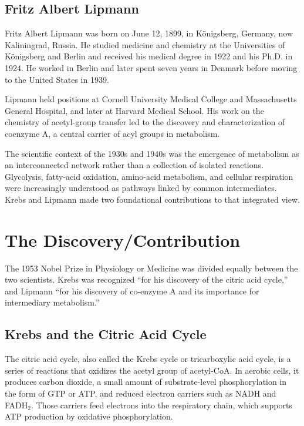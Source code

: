 \subsection{Fritz Albert Lipmann}

Fritz Albert Lipmann was born on June 12, 1899, in K\"onigsberg, Germany, now Kaliningrad, Russia. He studied medicine and chemistry at the Universities of K\"onigsberg and Berlin and received his medical degree in 1922 and his Ph.D. in 1924. He worked in Berlin and later spent seven years in Denmark before moving to the United States in 1939.

Lipmann held positions at Cornell University Medical College and Massachusetts General Hospital, and later at Harvard Medical School. His work on the chemistry of acetyl-group transfer led to the discovery and characterization of coenzyme A, a central carrier of acyl groups in metabolism.

The scientific context of the 1930s and 1940s was the emergence of metabolism as an interconnected network rather than a collection of isolated reactions. Glycolysis, fatty-acid oxidation, amino-acid metabolism, and cellular respiration were increasingly understood as pathways linked by common intermediates. Krebs and Lipmann made two foundational contributions to that integrated view.

\section{The Discovery/Contribution}

The 1953 Nobel Prize in Physiology or Medicine was divided equally between the two scientists. Krebs was recognized ``for his discovery of the citric acid cycle,'' and Lipmann ``for his discovery of co-enzyme A and its importance for intermediary metabolism.''\cite{nobel-1953}

\subsection{Krebs and the Citric Acid Cycle}

The citric acid cycle, also called the Krebs cycle or tricarboxylic acid cycle, is a series of reactions that oxidizes the acetyl group of acetyl-CoA. In aerobic cells, it produces carbon dioxide, a small amount of substrate-level phosphorylation in the form of GTP or ATP, and reduced electron carriers such as NADH and FADH$_2$. Those carriers feed electrons into the respiratory chain, which supports ATP production by oxidative phosphorylation.

